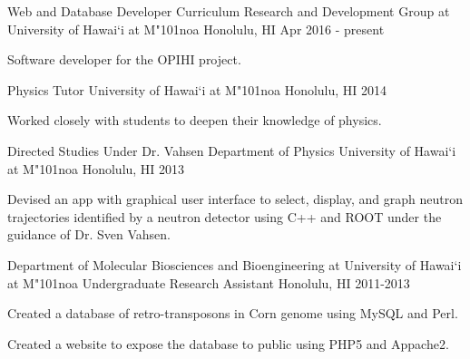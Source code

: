 \begin{cventries}
	\cventry
	{Web and Database Developer}
	{Curriculum Research and Development Group at University of Hawai`i at M{\char"101}noa}
	{Honolulu, HI}
	{Apr 2016 - present}
	{
		\begin{cvitems}
			\item {Software developer for the OPIHI project.}
		\end{cvitems}
	}
	
	\cventry
	{Physics Tutor}
	{University of Hawai`i at M{\char"101}noa}
	{Honolulu, HI}
	{2014}
	{
		\begin{cvitems}
			\item {Worked closely with students to deepen their knowledge of physics.}
		\end{cvitems}
	}
	\cventry
	{Directed Studies Under Dr. Vahsen}
	{Department of Physics University of Hawai`i at M{\char"101}noa}
	{Honolulu, HI}
	{2013}
	{
		\begin{cvitems}
			\item {Devised an app with graphical user interface to select, display, and graph neutron trajectories identified by a neutron detector using C++ and
				ROOT under the guidance of Dr. Sven Vahsen.}
		\end{cvitems}
	}
	\cventry
	{Department of Molecular Biosciences and Bioengineering at University of Hawai`i at M{\char"101}noa}
	{Undergraduate Research Assistant}
	{Honolulu, HI}
	{2011-2013}
	{
		\begin{cvitems}
			\item {Created a database of retro-transposons in Corn genome using MySQL and Perl.}
			\item {Created a website to expose the database to public using PHP5 and Appache2.}
		\end{cvitems}
	}
\end{cventries}

